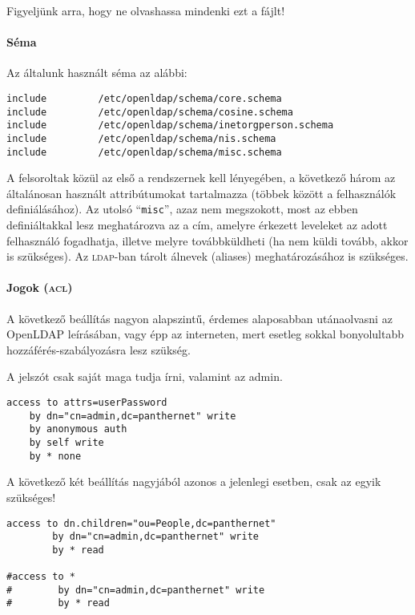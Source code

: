 Figyeljünk arra, hogy ne olvashassa mindenki ezt a fájlt!

\paragraph{Séma} Az általunk használt séma az alábbi:

\begin{Verbatim}[frame=single]
include         /etc/openldap/schema/core.schema
include         /etc/openldap/schema/cosine.schema
include         /etc/openldap/schema/inetorgperson.schema
include         /etc/openldap/schema/nis.schema
include         /etc/openldap/schema/misc.schema
\end{Verbatim}
  
A felsoroltak közül az első a rendszernek kell lényegében, a következő három az általánosan használt attribútumokat tartalmazza
(többek között a felhasználók definiálásához). Az utolsó ``\texttt{misc}'', azaz nem megszokott, most az ebben
definiáltakkal lesz meghatározva az a cím, amelyre érkezett leveleket az adott felhasználó fogadhatja, illetve melyre
továbbküldheti (ha nem küldi tovább, akkor is szükséges). Az \textsc{ldap}-ban tárolt álnevek (aliases) meghatározásához is
szükséges.

\paragraph{Jogok (\textsc{acl})} A következő beállítás nagyon alapszintű, érdemes alaposabban utánaolvasni az OpenLDAP
leírásában, vagy épp az interneten, mert esetleg sokkal bonyolultabb hozzáférés-szabályozásra lesz szükség.

A jelszót csak saját maga tudja írni, valamint az admin.

\begin{Verbatim}[frame=single]
access to attrs=userPassword
    by dn="cn=admin,dc=panthernet" write
    by anonymous auth
    by self write
    by * none
\end{Verbatim}    

A következő két beállítás nagyjából azonos a jelenlegi esetben, csak az egyik szükséges!

\begin{Verbatim}[frame=single]
access to dn.children="ou=People,dc=panthernet"
        by dn="cn=admin,dc=panthernet" write
        by * read

#access to *
#        by dn="cn=admin,dc=panthernet" write
#        by * read
\end{Verbatim}



